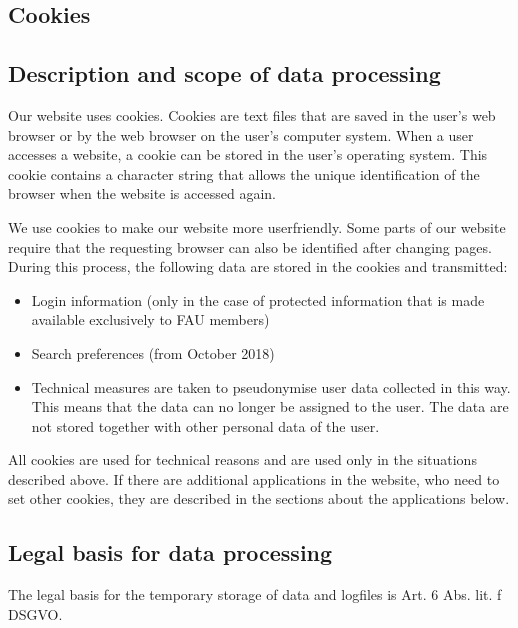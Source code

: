 \documentclass[letterpaper,10pt,english]{sphinxmanual}
\begin{document}
\subsection{Cookies}
\label{\detokenize{policies/privacy:cookies}}

\subsection{Description and scope of data processing}
\label{\detokenize{policies/privacy:id1}}
\sphinxAtStartPar
Our website uses cookies. Cookies are text files that are saved in the user’s web browser or by the web browser on the user’s computer system. When a user accesses a website, a cookie can be stored in the user’s operating system. This cookie contains a character string that allows the unique identification of the browser when the website is accessed again.

\sphinxAtStartPar
We use cookies to make our website more user\sphinxhyphen{}friendly. Some parts of our website require that the requesting browser can also be identified after changing pages.
During this process, the following data are stored in the cookies and transmitted:
\begin{itemize}
\item {} 
\sphinxAtStartPar
Log\sphinxhyphen{}in information (only in the case of protected information that is made available exclusively to FAU members)

\item {} 
\sphinxAtStartPar
Search preferences (from October 2018)

\item {} 
\sphinxAtStartPar
Technical measures are taken to pseudonymise user data collected in this way. This means that the data can no longer be assigned to the user. The data are not stored together with other personal data of the user.

\end{itemize}

\sphinxAtStartPar
All cookies are used for technical reasons and are used only in the situations described above. If there are additional applications in the website, who need to set other cookies, they are described in the sections about the applications below.


\subsection{Legal basis for data processing}
\label{\detokenize{policies/privacy:id2}}
\sphinxAtStartPar
The legal basis for the temporary storage of data and logfiles is Art. 6 Abs. lit. f DSGVO.
\end{document}
